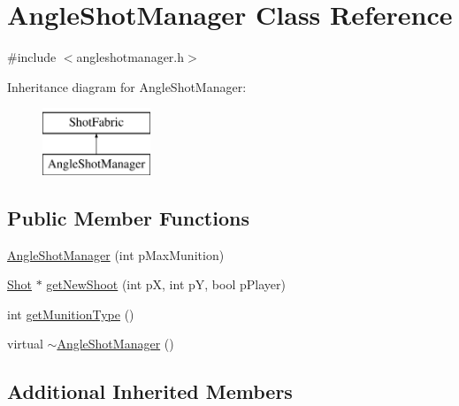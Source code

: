 \hypertarget{class_angle_shot_manager}{\section{Angle\-Shot\-Manager Class Reference}
\label{class_angle_shot_manager}
}


{\ttfamily \#include $<$angleshotmanager.\-h$>$}

Inheritance diagram for Angle\-Shot\-Manager\-:\begin{figure}[H]
\begin{center}
\leavevmode
\includegraphics[height=2.000000cm]{class_angle_shot_manager}
\end{center}
\end{figure}
\subsection*{Public Member Functions}
\begin{DoxyCompactItemize}
\item 
\hyperlink{class_angle_shot_manager_a54c7a8671c85d42273c716a66a699824}{Angle\-Shot\-Manager} (int p\-Max\-Munition)
\item 
\hyperlink{class_shot}{Shot} $\ast$ \hyperlink{class_angle_shot_manager_ab572dadf520c29aca5f563f88cc8655d}{get\-New\-Shoot} (int p\-X, int p\-Y, bool p\-Player)
\item 
int \hyperlink{class_angle_shot_manager_ab7a210ac59c662552496f301d52a3ec0}{get\-Munition\-Type} ()
\item 
virtual \hyperlink{class_angle_shot_manager_aba62a82bb5a01ee65d3f6015ec525bb9}{$\sim$\-Angle\-Shot\-Manager} ()
\end{DoxyCompactItemize}
\subsection*{Additional Inherited Members}


